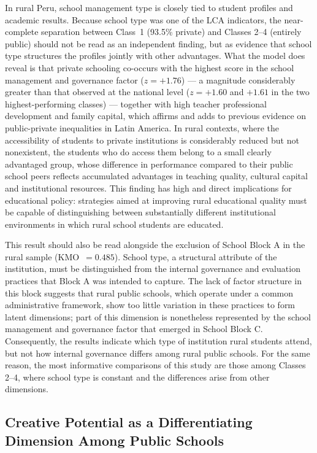 \documentclass[runningheads]{llncs}
\begin{document}
In rural Peru, school management type is closely tied to student
profiles and academic results. Because school type was one of
the LCA indicators, the near-complete separation between Class~1
(93.5\% private) and Classes 2--4 (entirely public) should not
be read as an independent finding, but as evidence that school
type structures the profiles jointly with other advantages. What
the model does reveal is that private schooling co-occurs with
the highest score in the school management and governance factor
(\(z = +1.76\)) --- a magnitude considerably greater than that
observed at the national level (\(z = +1.60\) and \(+1.61\) in
the two highest-performing classes) --- together with high
teacher professional development and family capital, which
affirms and adds to previous evidence on public-private
inequalities in Latin America. In rural contexts, where the
accessibility of students to private institutions is
considerably reduced but not nonexistent, the students who do
access them belong to a small clearly advantaged group, whose
difference in performance compared to their public school peers
reflects accumulated advantages in teaching quality, cultural
capital and institutional resources. This finding has high and
direct implications for educational policy: strategies aimed at
improving rural educational quality must be capable of
distinguishing between substantially different institutional
environments in which rural school students are educated.

This result should also be read alongside the exclusion of
School Block A in the rural sample (KMO~$= 0.485$). School type,
a structural attribute of the institution, must be distinguished
from the internal governance and evaluation practices that Block
A was intended to capture. The lack of factor structure in this
block suggests that rural public schools, which operate under a
common administrative framework, show too little variation in
these practices to form latent dimensions; part of this
dimension is nonetheless represented by the school management
and governance factor that emerged in School Block C.
Consequently, the results indicate which type of institution
rural students attend, but not how internal governance differs
among rural public schools. For the same reason, the most
informative comparisons of this study are those among Classes
2--4, where school type is constant and the differences arise
from other dimensions.

\subsection{Creative Potential as a Differentiating Dimension
Among Public Schools}
\end{document}

